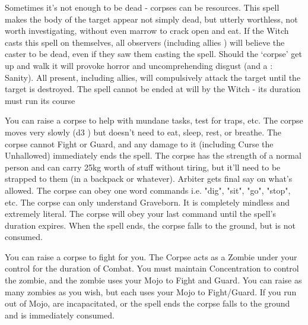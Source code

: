 {\NECRO[
  Name=Worthless Corpse,
  Link=necromancy-worthless-corpse,
  Paradigm=Death,
  Save=N,
  Duration=Session,
  Mod=+0,
  Keywords=None,
  Target=Close (touch) Mortal corpse
]


Sometimes it's not enough to be dead - corpses can be resources. This spell makes the body of the target appear not simply dead, but utterly worthless, not worth investigating, without even marrow to crack open and eat. If the Witch casts this spell on themselves, all observers (including allies ) will believe the caster to be dead, even if they saw them casting the spell. Should the ‘corpse’ get up and walk it will provoke horror and uncomprehending disgust (and a \RS: Sanity). All present, including allies, will compulsively attack the target until the target is destroyed.  The spell cannot be ended at will by the Witch - its duration must run its course

\NECRO[
  Name=Zombie Slave,
  Link=necromancy-zombie-slave,
  Paradigm=Death,
  Save=N,
  Duration=Session,
  Mod=+9,
  Keywords=None,
  Target=Close (touch) corpse
]


You can raise a corpse to help with mundane tasks, test for traps, etc.  The corpse moves very slowly (d3 \MD) but doesn't need to eat, sleep, rest, or breathe.  The corpse cannot Fight or Guard, and any damage to it (including Curse the Unhallowed) immediately ends the spell.  The corpse has the strength of a normal person and can carry 25kg worth of stuff without tiring, but it'll need to be strapped to them (in a backpack or whatever).  Arbiter gets final say on what's allowed. The corpse can obey one word commands i.e. "dig", "sit", "go", "stop", etc.  The corpse can only understand Graveborn. It is completely mindless and extremely literal. The corpse will obey your last command until the spell's duration expires.  When the spell ends, the corpse falls to the ground, but is not consumed.

\NECRO[
  Name=Zombie Warrior,
  Link=necromancy-zombie-warrior,
  Paradigm=Death,
  Save=N,
  Duration=Combat,
  Mod=+6,
  Keywords=Conc.,
  Target=Close (touch) corpse
]

You can raise a corpse to fight for you. The Corpse acts as a Zombie under your control for the duration of Combat.  You must maintain Concentration to control the zombie, and the zombie uses your Mojo to Fight and Guard.  You can raise as many zombies as you wish, but each uses your Mojo to Fight/Guard.  If you run out of Mojo, are incapacitated, or the spell ends the corpse falls to the ground and is immediately consumed.

}
